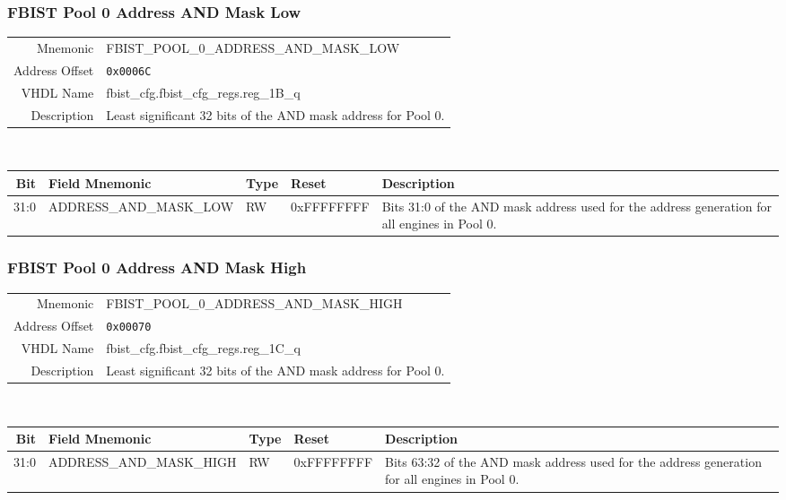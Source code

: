 \subsubsection{FBIST Pool 0 Address AND Mask Low}
\begin{tabular}{ r | p{350px} }
  Mnemonic       & FBIST\_POOL\_0\_ADDRESS\_AND\_MASK\_LOW \\
  Address Offset & \texttt{0x0006C}                        \\
  VHDL Name      &  fbist\_cfg.fbist\_cfg\_regs.reg\_1B\_q \\ \hline

  Description &
  Least significant 32 bits of the AND mask address for Pool 0. \\
\end{tabular}
\\
\begin{tabularx}{\textwidth}{r|l|l|l|X}
  \hline
  Bit   & Field Mnemonic          & Type & Reset      & Description \\ \hline

  31:0  & ADDRESS\_AND\_MASK\_LOW & RW   & 0xFFFFFFFF &

  Bits 31:0 of the AND mask address used for the address generation
  for all engines in Pool 0. \\
\end{tabularx}

\subsubsection{FBIST Pool 0 Address AND Mask High}
\begin{tabular}{ r | p{350px} }
  Mnemonic       & FBIST\_POOL\_0\_ADDRESS\_AND\_MASK\_HIGH \\
  Address Offset & \texttt{0x00070}                         \\
  VHDL Name      &  fbist\_cfg.fbist\_cfg\_regs.reg\_1C\_q  \\ \hline

  Description &
  Least significant 32 bits of the AND mask address for Pool 0. \\
\end{tabular}
\\
\begin{tabularx}{\textwidth}{r|l|l|l|X}
  \hline
  Bit   & Field Mnemonic           & Type & Reset      & Description \\ \hline

  31:0  & ADDRESS\_AND\_MASK\_HIGH & RW   & 0xFFFFFFFF &

  Bits 63:32 of the AND mask address used for the address generation
  for all engines in Pool 0. \\
\end{tabularx}

